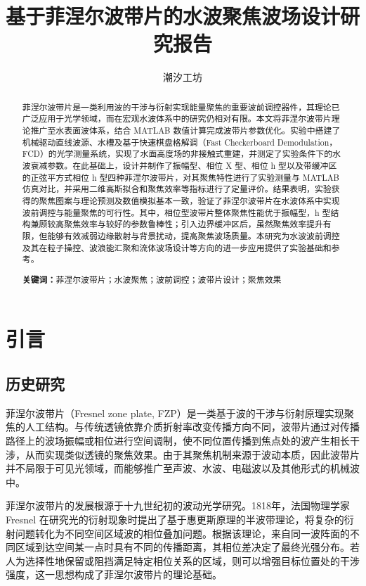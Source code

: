 \documentclass[11pt,a4paper]{ctexart}
\begin{document}
\title{\Large\bfseries 基于菲涅尔波带片的水波聚焦波场设计研究报告}
\author{潮汐工坊}
\date{ }
\maketitle


\begin{abstract}
菲涅尔波带片是一类利用波的干涉与衍射实现能量聚焦的重要波前调控器件，其理论已广泛应用于光学领域，而在宏观水波体系中的研究仍相对有限。本文将菲涅尔波带片理论推广至水表面波体系，结合 MATLAB 数值计算完成波带片参数优化。实验中搭建了机械驱动直线波源、水槽及基于快速棋盘格解调（Fast Checkerboard Demodulation，FCD）的光学测量系统，实现了水面高度场的非接触式重建，并测定了实验条件下的水波衰减参数。在此基础上，设计并制作了振幅型、相位 X 型、相位 h 型以及带缓冲区的正弦平方式相位 h 型四种菲涅尔波带片，对其聚焦特性进行了实验测量与 MATLAB 仿真对比，并采用二维高斯拟合和聚焦效率等指标进行了定量评价。结果表明，实验获得的聚焦图案与理论预测及数值模拟基本一致，验证了菲涅尔波带片在水波体系中实现波前调控与能量聚焦的可行性。其中，相位型波带片整体聚焦性能优于振幅型，h 型结构兼顾较高聚焦效率与较好的参数鲁棒性；引入边界缓冲区后，虽然聚焦效率提升有限，但能够有效减弱边缘散射与背景扰动，提高聚焦波场质量。本研究为水波波前调控及其在粒子操控、波浪能汇聚和流体波场设计等方向的进一步应用提供了实验基础和参考。

\vspace{0.8em}
\noindent\textbf{关键词：}菲涅尔波带片；水波聚焦；波前调控；波带片设计；聚焦效果
\end{abstract}
\newpage
\tableofcontents
\newpage

\section{引言}

\subsection{历史研究}

菲涅尔波带片（Fresnel zone plate, FZP）是一类基于波的干涉与衍射原理实现聚焦的人工结构。与传统透镜依靠介质折射率改变传播方向不同，波带片通过对传播路径上的波场振幅或相位进行空间调制，使不同位置传播到焦点处的波产生相长干涉，从而实现类似透镜的聚焦效果。由于其聚焦机制来源于波动本质，因此波带片并不局限于可见光领域，而能够推广至声波、水波、电磁波以及其他形式的机械波中。

菲涅尔波带片的发展根源于十九世纪初的波动光学研究。1818年，法国物理学家 Fresnel 在研究光的衍射现象时提出了基于惠更斯原理的半波带理论，将复杂的衍射问题转化为不同空间区域波的相位叠加问题\cite{Fresnel1818}。根据该理论，来自同一波阵面的不同区域到达空间某一点时具有不同的传播距离，其相位差决定了最终光强分布。若人为选择性地保留或阻挡满足特定相位关系的区域，则可以增强目标位置处的干涉强度，这一思想构成了菲涅尔波带片的理论基础。
\end{document}
